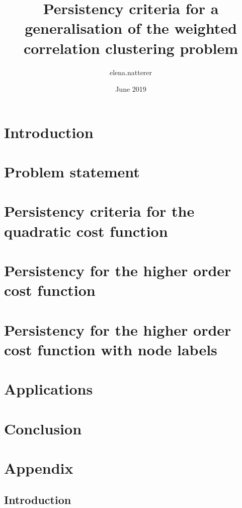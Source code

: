 \documentclass[12pt]{report}
\title{Persistency criteria for a generalisation of the weighted correlation clustering problem}
\author{elena.natterer }
\date{June 2019}
\theoremstyle{definition}
\theoremstyle{remark}
\begin{document}
\maketitle

     
\tableofcontents      
\chapter{Introduction}

\chapter{Problem statement}

\chapter{Persistency criteria for the quadratic cost function}

\chapter{Persistency for the higher order cost function}

\chapter{Persistency for the higher order cost function with node labels}

\chapter{Applications}

\chapter{Conclusion}


\appendix
\chapter{Appendix}

\listoffigures

\section{Introduction}
\end{document}
